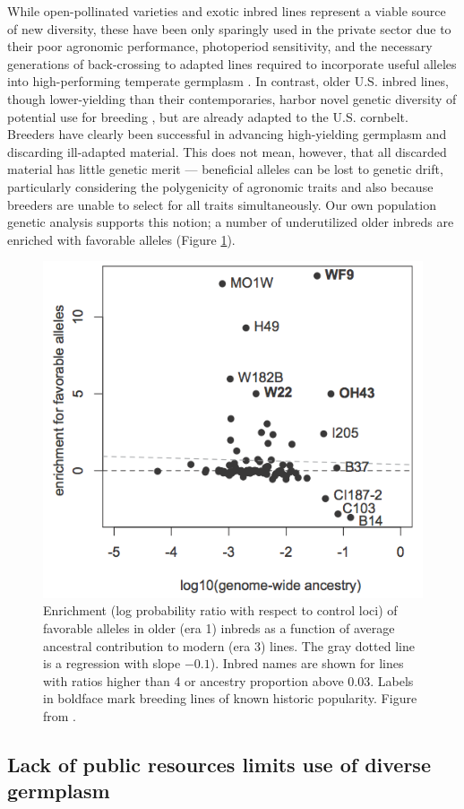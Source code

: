 \documentclass[12pt]{article}
\begin{document}
While open-pollinated varieties and exotic inbred lines represent a viable source of new diversity, these have been only sparingly used in the private sector due to their poor agronomic performance, photoperiod sensitivity, and the necessary generations of back-crossing to adapted lines required to incorporate useful alleles into high-performing temperate germplasm \citep{goodman1999broadening}.
In contrast, older U.S. inbred lines, though lower-yielding than their contemporaries, harbor novel genetic diversity of potential use for breeding \citep[e.g.][]{chen2012characterization,wisser2011multivariate}, but are already adapted to the U.S. cornbelt.  
Breeders have clearly been successful in advancing high-yielding germplasm and discarding ill-adapted material.
This does not mean, however, that all discarded material has little genetic merit --- beneficial alleles can be lost to genetic drift, particularly considering the polygenicity of agronomic traits and also because breeders are unable to select for all traits simultaneously. Our own population genetic analysis supports this notion; a number of underutilized older inbreds are enriched with favorable alleles (Figure \ref{fig:wf9}). 

\begin{figure}
\includegraphics[width=0.55\linewidth]{joost_wf9.png}
\caption{Enrichment (log probability ratio with respect to control loci) of favorable alleles in older (era 1) inbreds as a function of average ancestral contribution to modern (era 3) lines. The gray dotted line is a  regression with slope $-0.1$). Inbred names are shown for lines with ratios higher than 4 or ancestry proportion above 0.03. Labels in boldface mark breeding lines of known historic popularity. Figure from \citet{van2012historical}.} 
\label{fig:wf9}
\end{figure}

\subsection*{Lack of public resources limits use of diverse germplasm}
\end{document}

